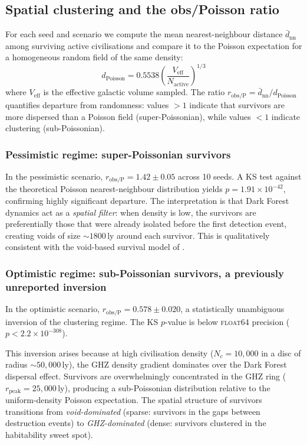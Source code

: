 \documentclass[useAMS,usenatbib]{mn2e}
\begin{document}
\subsection{Spatial clustering and the obs/Poisson ratio}
\label{sec:clustering}

For each seed and scenario we compute the mean nearest-neighbour
distance $\bar{d}_\text{nn}$ among surviving active civilisations and
compare it to the Poisson expectation for a homogeneous random field
of the same density:
\begin{equation}
  d_\text{Poisson} = 0.5538 \left(\frac{V_\text{eff}}{N_\text{active}}\right)^{1/3}
  \label{eq:poisson_nn}
\end{equation}
where $V_\text{eff}$ is the effective galactic volume sampled.
The ratio $r_\text{obs/P} = \bar{d}_\text{nn}/d_\text{Poisson}$
quantifies departure from randomness: values $>1$ indicate that
survivors are more dispersed than a Poisson field (super-Poissonian),
while values $<1$ indicate clustering (sub-Poissonian).

\subsubsection{Pessimistic regime: super-Poissonian survivors}

In the pessimistic scenario, $r_\text{obs/P} = 1.42 \pm 0.05$
across 10 seeds.
A KS test against the theoretical Poisson nearest-neighbour
distribution yields $p = 1.91\times10^{-42}$, confirming highly
significant departure.
The interpretation is that Dark Forest dynamics act as a
\emph{spatial filter}: when density is low, the survivors are
preferentially those that were already isolated before the first
detection event, creating voids of size $\sim 1800$\,ly around each
survivor.
This is qualitatively consistent with the void-based survival model
of \citet{forgan2011}.

\subsubsection{Optimistic regime: sub-Poissonian survivors,
  a previously unreported inversion}
\label{sec:inversion}

In the optimistic scenario, $r_\text{obs/P} = 0.578 \pm 0.020$,
a statistically unambiguous inversion of the clustering regime.
The KS $p$-value is below \textsc{float64} precision
($p < 2.2\times10^{-308}$).

This inversion arises because at high civilisation density
($N_c = 10{,}000$ in a disc of radius $\sim 50{,}000$\,ly),
the GHZ density gradient dominates over the Dark Forest
dispersal effect.
Survivors are overwhelmingly concentrated in the GHZ ring
($r_\text{peak} = 25{,}000$\,ly), producing a sub-Poissonian
distribution relative to the uniform-density Poisson expectation.
The spatial structure of survivors transitions from
\emph{void-dominated} (sparse: survivors in the gaps between
destruction events) to \emph{GHZ-dominated} (dense: survivors
clustered in the habitability sweet spot).
\end{document}
